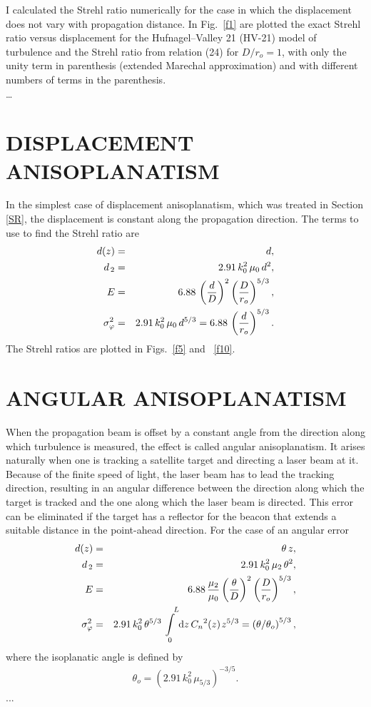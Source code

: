 I calculated the Strehl ratio numerically for the case in which
the displacement does not vary with propagation distance.  In
Fig.~\ref{f1}   are plotted the exact Strehl ratio versus
displacement for the  Hufnagel--Valley 21 (HV-21) model of
turbulence\cite{10,11,12} and  the Strehl ratio from relation (24)
for  $D/ r_o  = 1$, with only the unity term in parenthesis
(extended  Marechal approximation) and with different numbers of
terms in the  parenthesis. \\
\ldots         \\

\section{ DISPLACEMENT ANISOPLANATISM}
\label{da}
In the simplest case of displacement  anisoplanatism, which was
treated in Section \ref{SR}, the displacement is  constant along
the propagation direction.  The terms to use to find the  Strehl
ratio are  \begin{eqnarray}  d(z)&=&d  ,  \\
d_{\,2}&=&2.91\,k_0^2\,\mu _0\,d^2  ,     \\ E&=&6.88\,\left( {{d
\over D}} \right)^2\left(  {{D \over {r_o}}} \right)^{5/3}  ,
 \\ \sigma _\varphi ^2&=&2.91\,k_0^2\,\mu _0\,d^{5/3}=6.88\, \left(
{{d \over {r_o}}} \right)^{5/3}  .  \end{eqnarray} The Strehl
ratios are plotted in Figs.~\ref{f5}  and ~\ref{f10}.

\section{ ANGULAR ANISOPLANATISM}
\label{aa}
When the propagation beam is offset by a  constant angle from the
direction along which turbulence is measured,  the effect is called
angular anisoplanatism.\cite{4}  It arises naturally  when one is
tracking a satellite target and directing a laser beam at  it.
Because of the finite speed of light, the laser beam has to lead
the tracking direction, resulting in an angular difference between
the  direction along which the target is tracked and the one along
which the  laser beam is directed.  This error can be eliminated if
the target has  a reflector for the beacon that extends a suitable
distance in the  point-ahead direction.  For the case of an angular
error  \begin{eqnarray} d(z)&=&\theta \,z  ,         \\
d_{\,2}&=&2.91\,k_0^2\,\mu  _2\,\theta ^2  ,               \\
E&=&6.88\,{{\mu _2} \over {\mu _0}}\left(  {{\theta  \over D}}
\right)^2\left( {{D \over {r_o}}} \right)^{5/3}   ,
        \\ \sigma  _\varphi ^2&=&2.91\,k_0^2\,\theta ^{5/
3}\int\limits_{\,\,\, 0}^{\,\,\,\,\,\, L}  {{\rm d}z\,{C_n}^2(z)}\kern
1ptz^{5/ 3}=\left( {\theta / \theta _o}  \right)^{5/ 3}  ,
\end{eqnarray} where the isoplanatic angle is defined by
\begin{eqnarray} \theta _o^{}=\left( {2.91\,k_0^2\,\mu _{5/ 3}}
\right)^{-3/ 5}  .   \end{eqnarray} ...
